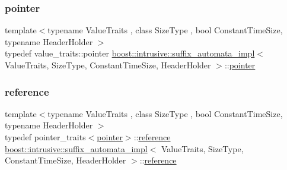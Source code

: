 \subsubsection{\texorpdfstring{pointer}{pointer}}
{\footnotesize\ttfamily template$<$typename Value\+Traits , class Size\+Type , bool Constant\+Time\+Size, typename Header\+Holder $>$ \\
typedef value\+\_\+traits\+::pointer \hyperlink{classboost_1_1intrusive_1_1suffix__automata__impl}{boost\+::intrusive\+::suffix\+\_\+automata\+\_\+impl}$<$ Value\+Traits, Size\+Type, Constant\+Time\+Size, Header\+Holder $>$\+::\hyperlink{classboost_1_1intrusive_1_1suffix__automata__impl_aa30039fa797b95a84660985ab506f6ef}{pointer}}

\mbox{\label{classboost_1_1intrusive_1_1suffix__automata__impl_a65352a440751b963521c55774953f0e4}} 
\subsubsection{\texorpdfstring{reference}{reference}}
{\footnotesize\ttfamily template$<$typename Value\+Traits , class Size\+Type , bool Constant\+Time\+Size, typename Header\+Holder $>$ \\
typedef pointer\+\_\+traits$<$\hyperlink{classboost_1_1intrusive_1_1suffix__automata__impl_aa30039fa797b95a84660985ab506f6ef}{pointer}$>$\+::\hyperlink{classboost_1_1intrusive_1_1suffix__automata__impl_a65352a440751b963521c55774953f0e4}{reference} \hyperlink{classboost_1_1intrusive_1_1suffix__automata__impl}{boost\+::intrusive\+::suffix\+\_\+automata\+\_\+impl}$<$ Value\+Traits, Size\+Type, Constant\+Time\+Size, Header\+Holder $>$\+::\hyperlink{classboost_1_1intrusive_1_1suffix__automata__impl_a65352a440751b963521c55774953f0e4}{reference}}

\mbox{\label{classboost_1_1intrusive_1_1suffix__automata__impl_ad2fe9bd542f914c94c7d0e42cce5613c}} 
